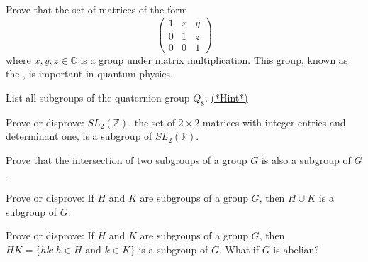   
\begin{exercise}{} 
Prove that the set of matrices of the form
\[
\begin{pmatrix}
1 & x & y \\
0 & 1 & z \\
0 & 0 & 1
\end{pmatrix}
\]
where $x,y,z \in \mathbb{C}$ is a group under matrix multiplication.  This group, known as the
, is important in
quantum physics.
\end{exercise}  
  

\begin{exercise}{}\label{ex:Groups:quat}
List all subgroups of the quaternion group $Q_8$. \hyperref[sec:Groups:Hints]{(*Hint*)}
\end{exercise} 
 
\begin{exercise}{}
Prove or disprove: $SL_2( {\mathbb Z} )$, the set of $2 \times 2$
matrices with integer entries and determinant one, is a subgroup of
$SL_2( {\mathbb R} )$. 
\end{exercise}
 
\begin{exercise}{}\label{ex:eoc:31}
Prove that the intersection of two subgroups of a group $G$ is also a
subgroup of $G$. 
 \end{exercise}
 
\begin{exercise}{}
Prove or disprove:  If $H$ and $K$ are subgroups of a group $G$, then
$H \cup K$ is a subgroup of $G$. 
\end{exercise} 
 
\begin{exercise}{}
Prove or disprove: If $H$ and $K$ are subgroups of a group $G$, then
$H K = \{hk : h \in H \text{ and } k \in K \}$ is a subgroup of $G$.
What if $G$ is abelian? 
\end{exercise} 
 
